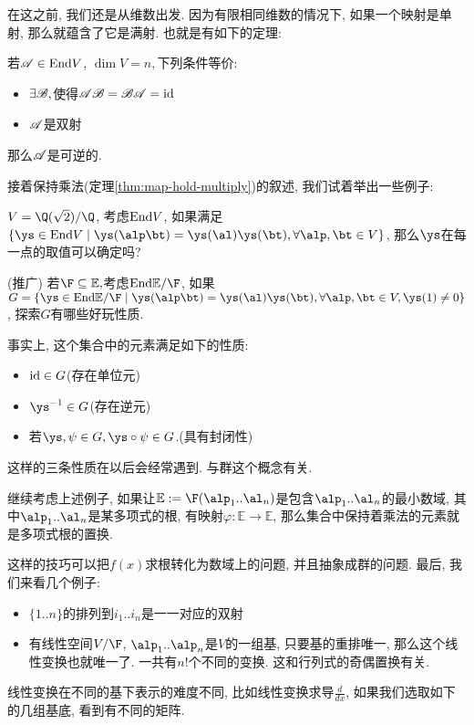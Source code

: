 在这之前, 我们还是从维数出发. 因为有限相同维数的情况下, 如果一个映射是单射, 那么就蕴含了它是满射. 也就是有如下的定理: 
\begin{thm}
若$\mathscr{A}\in\text{End} V$, $\dim V=n,$下列条件等价:
\begin{itemize}
\item $\exists\mathscr{B},$使得$\mathscr{A}\mathscr{B}=\mathscr{B}\mathscr{A}=\text{id}$
\item $\mathscr{A}$是双射
\end{itemize}
那么$\mathscr{A}$是可逆的.
\end{thm}
接着保持乘法(定理\ref{thm:map-hold-multiply})的叙述, 我们试着举出一些例子: 
\begin{example}
$V=\Q(\sqrt{2})/\Q$, 考虑$\text{End} V$, 如果满足$\{\ys\in\End V\mid\ys(\alp\bt)=\ys(\al)\ys(\bt),\forall\alp,\bt\in V\}$,
那么$\ys$在每一点的取值可以确定吗?
\end{example}
%
\begin{example}
(推广) 若$\F\subseteq\mathbb{E},$考虑$\End\mathbb{E}/\F$, 如果$G=\{\ys\in\End\mathbb{E}/\F\mid\ys(\alp\bt)=\ys(\al)\ys(\bt),\forall\alp,\bt\in V,\ys(1)\neq0\}$,
探索$G$有哪些好玩性质.
\end{example}
事实上, 这个集合中的元素满足如下的性质: 
\begin{itemize}
\item $\text{id}\in G$(存在单位元)
\item $\ys^{-1}\in G$(存在逆元)
\item 若$\ys,\psi\in G,\ys\circ\psi\in G$.(具有封闭性)
\end{itemize}
这样的三条性质在以后会经常遇到. 与群这个概念有关. 
\begin{example}
继续考虑上述例子, 如果让$\mathbb{E}:=\F(\alp_{1}..\al_{n})$是包含$\alp_{1}..\al_{n}$的最小数域,
其中$\alp_{1}..\al_{n}$是某多项式的根, 有映射$\varphi:\mathbb{E}\to\mathbb{E}$,
那么集合中保持着乘法的元素就是多项式根的置换. 
\end{example}
这样的技巧可以把$f(x)$求根转化为数域上的问题, 并且抽象成群的问题. 最后, 我们来看几个例子: 
\begin{itemize}
\item $\{1..n\}$的排列到$i_{1}..i_{n}$是一一对应的双射
\item 有线性空间$V/\F$, $\alp_{1}..\alp_{n}$是$V$的一组基, 只要基的重排唯一, 那么这个线性变换也就唯一了.
一共有$n!$个不同的变换. 这和行列式的奇偶置换有关. 
\end{itemize}
线性变换在不同的基下表示的难度不同, 比如线性变换求导$\frac{d}{dx}$, 如果我们选取如下的几组基底, 看到有不同的矩阵. 

